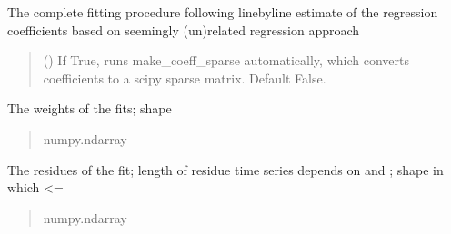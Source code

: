 \documentclass[letterpaper,10pt,english]{sphinxmanual}
\begin{document}
\begin{fulllineitems}
\begin{fulllineitems}
\sphinxAtStartPar
The complete fitting procedure following line\sphinxhyphen{}by\sphinxhyphen{}line estimate
of the regression coefficients based on seemingly (un)related
regression approach
\begin{quote}\begin{description}
\sphinxAtStartPar
{} () \textendash{} If True, runs make\_coeff\_sparse automatically,
which converts coefficients to a scipy sparse
matrix. Default False.

\end{description}\end{quote}

\begin{fulllineitems}
\label{\detokenize{kalman:glomar_gridding.autocorrelation.LassoEstimate_AR1.coefficients}}
\pysigstartsignatures
\pysigline
{}
\pysigstopsignatures
\sphinxAtStartPar
The weights of the fits;
shape 
\begin{quote}\begin{description}
\sphinxAtStartPar
numpy.ndarray

\end{description}\end{quote}

\end{fulllineitems}


\begin{fulllineitems}
\label{\detokenize{kalman:glomar_gridding.autocorrelation.LassoEstimate_AR1.residues}}
\pysigstartsignatures
\pysigline
{}
\pysigstopsignatures
\sphinxAtStartPar
The residues of the fit;
length of residue time series depends on
 and ;
shape  in which  \textless{}= 
\begin{quote}\begin{description}
\sphinxAtStartPar
numpy.ndarray


\end{description}
\end{quote}
\end{fulllineitems}
\end{fulllineitems}
\end{fulllineitems}
\end{document}
